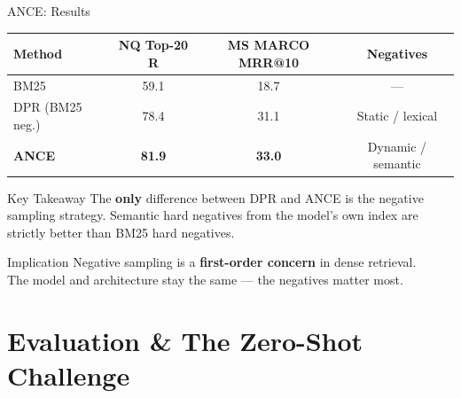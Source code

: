 \documentclass[aspectratio=169]{beamer}
\newif\ifanimated
\newcommand{\cpause}{\ifanimated\pause\fi}
\begin{document}
\begin{frame}[shrink=15]{ANCE: Results}
\begin{center}
\begin{tabular}{lccc}
\toprule
\textbf{Method} & \textbf{NQ Top-20 R} & \textbf{MS MARCO MRR@10} & \textbf{Negatives} \\
\midrule
BM25 & 59.1 & 18.7 & --- \\
DPR (BM25 neg.) & 78.4 & 31.1 & Static / lexical \\
\textbf{ANCE} & \textbf{81.9} & \textbf{33.0} & Dynamic / semantic \\
\bottomrule
\end{tabular}
\end{center}

\cpause
\vspace{1em}

\begin{exampleblock}{Key Takeaway}
The \textbf{only} difference between DPR and ANCE is the negative sampling strategy. Semantic hard negatives from the model's own index are strictly better than BM25 hard negatives.
\end{exampleblock}

\begin{alertblock}{Implication}
Negative sampling is a \textbf{first-order concern} in dense retrieval. \\The model and architecture stay the same --- the negatives matter most.
\end{alertblock}
\end{frame}

\section{Evaluation \& The Zero-Shot Challenge}

\begin{frame}[plain]
\sectionpage
\end{frame}
\end{document}
